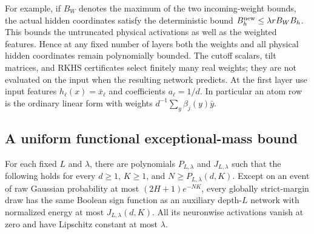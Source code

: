 For example, if $B_W$ denotes the maximum of the two incoming-weight
bounds, the actual hidden coordinates satisfy the deterministic bound
$B_h^{\rm new}\le\lambda rB_WB_h$. This bounds the untruncated physical
activations as well as the weighted features. Hence at any fixed number
of layers both the weights and all physical hidden coordinates remain
polynomially bounded. The cutoff scalars, tilt matrices, and RKHS
certificates select finitely many real weights; they are not evaluated
on the input when the resulting network predicts.
At the first layer use input features $h_\ell(x)=\bar x_\ell$ and
coefficients $a_\ell=1/d$. In particular an atom row is the ordinary
linear form with weights $d^{-1}\sum_y\beta_j(y)\bar y$.

\subsection{A uniform functional exceptional-mass bound}
\begin{proposition}
\label{prop:generic-meanfield-compression}
For each fixed $L$ and $\lambda$, there are polynomials
$P_{L,\lambda}$ and $J_{L,\lambda}$ such that the following holds for
every $d\ge1$, $K\ge1$, and
$N\ge P_{L,\lambda}(d,K)$. Except on an event of raw Gaussian probability
at most $(2H+1)e^{-NK}$, every globally strict-margin draw has the same
Boolean sign function as an auxiliary depth-$L$ network with normalized
energy at most $J_{L,\lambda}(d,K)$. All its neuronwise activations vanish
at zero and have Lipschitz constant at most $\lambda$.
\end{proposition}
